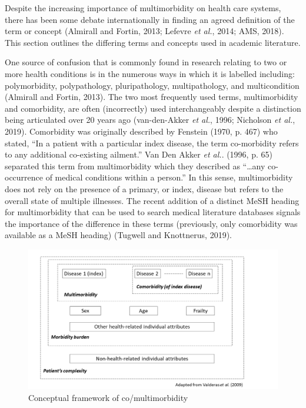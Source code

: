 \documentclass[12pt,a4paper,oneside,table]{report}
\begin{document}
Despite the increasing importance of multimorbidity on health care
systems, there has been some debate internationally in finding an agreed
definition of the term or concept (Almirall and Fortin, 2013; Lefevre
\emph{et al.}, 2014; AMS, 2018). This section outlines the differing
terms and concepts used in academic literature.

One source of confusion that is commonly found in research relating to
two or more health conditions is in the numerous ways in which it is
labelled including: polymorbidity, polypathology, pluripathology,
multipathology, and multicondition (Almirall and Fortin, 2013). The two
most frequently used terms, multimorbidity and comorbidity, are often
(incorrectly) used interchangeably despite a distinction being
articulated over 20 years ago (van-den-Akker \emph{et al.}, 1996;
Nicholson \emph{et al.}, 2019). Comorbidity was originally described by
Fenstein (1970, p. 467) who stated, ``In a patient with a particular
index disease, the term co-morbidity refers to any additional
co-existing ailment.'' Van Den Akker \textit{et al.}. (1996, p. 65)
separated this term from multimorbidity which they described as
``\ldots{}any co-occurrence of medical conditions within a person.'' In
this sense, multimorbidity does not rely on the presence of a primary,
or index, disease but refers to the overall state of multiple illnesses.
The recent addition of a distinct MeSH heading for multimorbidity that
can be used to search medical literature databases signals the
importance of the difference in these terms (previously, only
comorbidity was available as a MeSH heading) (Tugwell and Knottnerus,
2019).

\begin{figure}[h]
  \centering
    \includegraphics{figures/chapter-lit-review/valderas_2.pdf}
    \caption{Conceptual framework of co/multimorbidity}
    \label{fig:valderas}
\end{figure}
\end{document}
